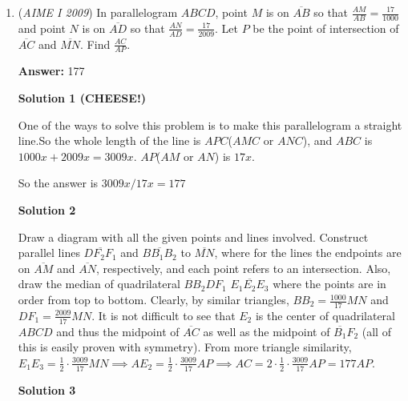 \begin{enumerate}
 This can be factored into $(4P-5)(6P-5)$

 This yields two solutions: $\frac54$ (ignored because it would result in $1-p<0$  ) or $\frac56$

 Therefore, the answer is $5+6$ = $\boxed {011}$



	\item (\textit{AIME I 2009}) In parallelogram $ABCD$, point $M$ is on $\overline{AB}$ so that $\frac {AM}{AB} = \frac {17}{1000}$ and point $N$ is on $\overline{AD}$ so that $\frac {AN}{AD} = \frac {17}{2009}$. Let $P$ be the point of intersection of $\overline{AC}$ and $\overline{MN}$. Find $\frac {AC}{AP}$.


 
 \textbf{Answer: }177



\textbf{Solution 1 (CHEESE!)}

One of the ways to solve this problem is to make this parallelogram a straight line.So the whole length of the line is $APC$($AMC$ or $ANC$), and $ABC$ is $1000x+2009x=3009x.$
$AP$($AM$ or $AN$) is $17x.$

 So the answer is $3009x/17x = \boxed{177}$




\textbf{Solution 2}

Draw a diagram with all the given points and lines involved. Construct parallel lines $\overline{DF_2F_1}$ and $\overline{BB_1B_2}$ to $\overline{MN}$, where for the lines the endpoints are on $\overline{AM}$ and $\overline{AN}$, respectively, and each point refers to an intersection. Also, draw the median of quadrilateral $BB_2DF_1$ $\overline{E_1E_2E_3}$ where the points are in order from top to bottom. Clearly, by similar triangles, $BB_2 = \frac {1000}{17}MN$ and $DF_1 = \frac {2009}{17}MN$. It is not difficult to see that $E_2$ is the center of quadrilateral $ABCD$ and thus the midpoint of $\overline{AC}$ as well as the midpoint of $\overline{B_1}{F_2}$ (all of this is easily proven with symmetry). From more triangle similarity, $E_1E_3 = \frac12\cdot\frac {3009}{17}MN\implies AE_2 = \frac12\cdot\frac {3009}{17}AP\implies AC = 2\cdot\frac12\cdot\frac {3009}{17}AP$$= \boxed{177}AP$.

 



\textbf{Solution 3}


\end{enumerate}
